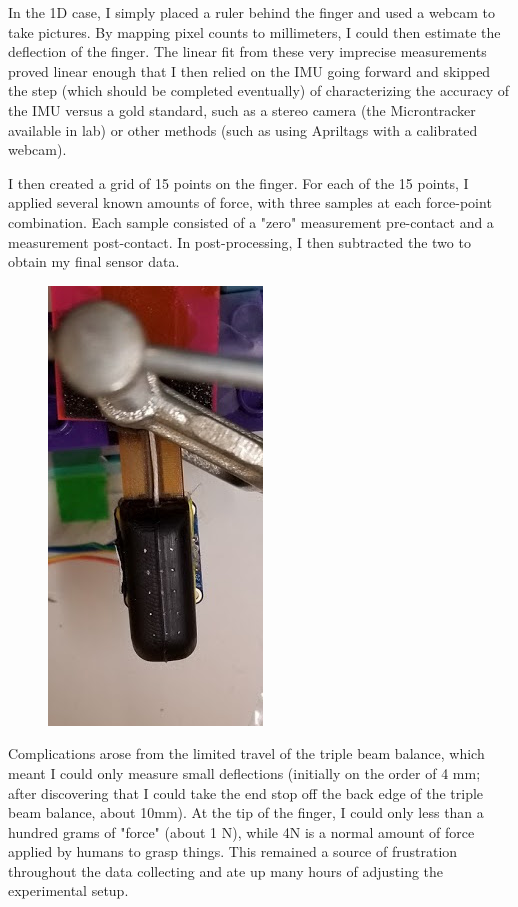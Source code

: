 \documentclass[preprint,12pt,3p]{elsarticle}
\begin{document}
In the 1D case, I simply placed a ruler behind the finger and used a webcam to take
pictures. By mapping pixel counts to millimeters, I could then estimate the deflection of the
finger. The linear fit from these very imprecise measurements proved linear enough that I then
relied on the IMU going forward and skipped the step (which should be completed eventually) of
characterizing the accuracy of the IMU versus a gold standard, such as a stereo camera (the
Microntracker available in lab) or other methods (such as using Apriltags with a calibrated webcam). 

I then created a grid of 15 points on the finger. For each of the 15 points, I applied several known
amounts of force, with three samples at each force-point combination. Each sample consisted of a
"zero" measurement pre-contact and a measurement post-contact. In post-processing, I then subtracted
the two to obtain my final sensor data.

\begin{figure}[H]
\centering
\includegraphics[width=.15\textheight]{images/setup/grid2.jpg}
\end{figure}


Complications arose from the limited travel of the triple beam balance, which meant I could only
measure small deflections (initially on the order of 4 mm; after discovering that I could take the
end stop off the back edge of the triple beam balance, about 10mm). At the tip of the finger, I
could only less than a hundred grams of "force" (about 1 N), while 4N is a normal amount of force
applied by humans to grasp things. This remained a source of frustration throughout the data
collecting and ate up many hours of adjusting the experimental setup. 
\end{document}
